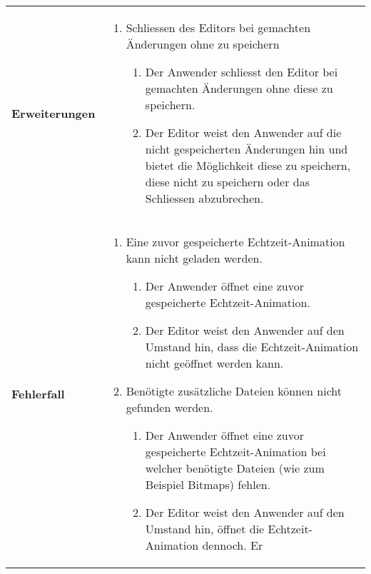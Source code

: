\begin{longtabu}{p{0.5\textwidth}p{0.5\textwidth}}
    \cmidrule(r){1-1}\cmidrule(lr){2-2}
        \textbf{Erweiterungen} &
        \begin{enumerate}[label= (\alph*)]
            \item{Schliessen des Editors bei gemachten Änderungen ohne zu
                    speichern
                \begin{enumerate}[label= (\roman*)]
                    \item{Der Anwender schliesst den Editor bei gemachten
                            Änderungen ohne diese zu speichern.}
                    \item{Der Editor weist den Anwender auf die
                            nicht gespeicherten Änderungen hin und bietet
                            die Möglichkeit diese zu speichern, diese nicht
                            zu speichern oder das Schliessen abzubrechen.}
                \end{enumerate}
            }
        \end{enumerate}\\
    \cmidrule(r){1-1}\cmidrule(lr){2-2}
        \textbf{Fehlerfall} &
        \begin{enumerate}[label= (\alph*)]
            \item{Eine zuvor gespeicherte Echtzeit-Animation kann nicht
                    geladen werden.
                \begin{enumerate}[label= (\roman*)]
                    \item{Der Anwender öffnet eine zuvor gespeicherte
                            Echtzeit-Animation.}
                    \item{Der Editor weist den Anwender auf den Umstand
                            hin, dass die Echtzeit-Animation nicht geöffnet
                            werden kann.}
                \end{enumerate}
            }
            \item{Benötigte zusätzliche Dateien können nicht gefunden
                    werden.
                \begin{enumerate}[label= (\roman*)]
                    \item{Der Anwender öffnet eine zuvor gespeicherte
                            Echtzeit-Animation bei welcher benötigte
                            Dateien (wie zum Beispiel Bitmaps) fehlen.}
                    \item{Der Editor weist den Anwender auf den Umstand
                            hin, öffnet die Echtzeit-Animation dennoch. Er
}
\end{enumerate}}
\end{enumerate}
\end{longtabu}
